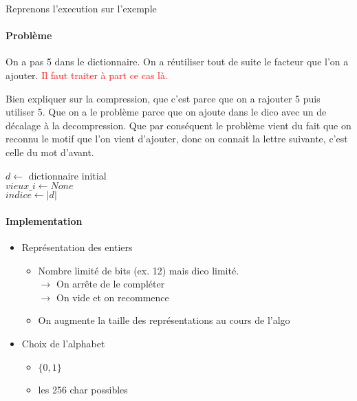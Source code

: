 \begin{com}
	Reprenons l'execution sur l'exemple
\end{com}

\paragraph{Problème} On a pas 5 dans le dictionnaire. On a réutiliser tout de suite le facteur que l'on a ajouter. \textcolor{red}{Il faut traiter à part ce cas là.}

\begin{com}
	Bien expliquer sur la compression, que c'est parce que on a rajouter 5 puis utiliser 5. Que on a le problème parce que on ajoute dans le dico avec un de décalage à la decompression. Que par conséquent le problème vient du fait que on reconnu le motif que l'on vient d'ajouter, donc on connait la lettre suivante, c'est celle du mot d'avant.
\end{com}

\begin{algorithm}[H]
	$d \gets$ dictionnaire initial\\
	$vieux\_i \gets None$\\
	$indice \gets |d|$\\
\end{algorithm}




\paragraph{Implementation}\begin{itemize}
	\item Représentation des entiers \begin{itemize}[label=$\to$]
		\item Nombre limité de bits (ex. 12) mais dico limité.\\
		$\to$ On arrête de le compléter \\
		$\to$ On vide et on recommence
		\item On augmente la taille des représentations au cours de l'algo\\
	\end{itemize}
	\item Choix de l'alphabet \begin{itemize}
		\item $\{0,1\}$
		\item les 256 char possibles
	\end{itemize}
\end{itemize}


